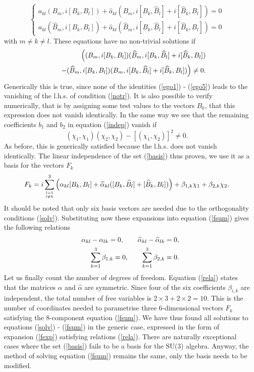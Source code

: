 \documentclass[a4paper,12pt]{article}
\begin{document}
$$ \left\{ \begin{array}{l} 
 \! a_{kl} (B_m,i[B_k,B_l]) + \widehat{a}_{kl} (B_m,i[B_k,\widehat{B}_l] + i[\widehat{B}_k,B_l]) = 0 \\
 \! a_{kl} (\widehat{B}_m,i[B_k,B_l]) + \widehat{a}_{kl} (\widehat{B}_m,i[B_k,\widehat{B}_l] + i[\widehat{B}_k,B_l]) = 0
 \end{array} \right. $$
with $m \neq k \neq l.$ These equations have no non-trivial solutions if
\begin{eqnarray} \label{notr}
&& \Bigl( (B_m,i[B_k,B_l]) (\widehat{B}_m,i[B_k,\widehat{B}_l] + i[\widehat{B}_k,B_l]) \\*
&&\hspace{1em} - (\widehat{B}_m,i[B_k,B_l]) (B_m,i[B_k,\widehat{B}_l] + i[\widehat{B}_k,B_l])  \Bigr) \neq 0. 
\nonumber 
\end{eqnarray}
Generically this is true, since none of the identities (\ref{ego1}) - (\ref{ego5}) leads to the vanishing of the l.h.s. of condition (\ref{notr}). It is also possible to verify numerically, that is by assigning some test values to the vectors $B_k$, that this expression does not vanish identically.
In the same way we see that the remaining coefficients $b_1$ and $b_2$ in equation (\ref{indep}) vanish if
$$ (\chi_1,\chi_1) (\chi_2,\chi_2) - \left[ (\chi_1,\chi_2) \right]^2 \neq 0. $$
As before, this is generically satisfied because the l.h.s. does not vanish identically. The linear independence of the set (\ref{basis}) thus proven, we use it as a basis for the vectors 
$F_k$  
\begin{equation} \label{fexp}
F_k = i\sum_{l=1 \atop l \neq k}^3 \left( \alpha_{kl} [B_k,B_l] + \widehat{\alpha}_{kl} ([B_k,\widehat{B}_l] + [\widehat{B}_k,B_l]) \right) + \beta_{1,k} \chi_1 + \beta_{2,k} \chi_2.
\end{equation}
It should be noted that only six basis vectors are needed due to the orthogonality conditions (\ref{solv}). Substituting now these expansions into equation (\ref{fsum}) gives the following relations
\begin{eqnarray} \label{rela}
&&\alpha_{kl} - \alpha_{lk} = 0, \qquad \widehat{\alpha}_{kl} - \widehat{\alpha}_{lk} = 0, \nonumber \\*
&&\hspace{0.9em} \sum_{k=1}^3 \beta_{1,k} = 0, \qquad \sum_{k=1}^3 \beta_{2,k} = 0.
\end{eqnarray}
Let us finally count the number of degrees of freedom. Equation (\ref{rela}) states that the matrices $\alpha$ and $\widehat{\alpha}$ are symmetric. Since four of the six coefficients $\beta_{i,k}$ are independent, the total number of free variables is $2 \times 3 + 2 \times 2 = 10$. This is the number of coordinates needed to parametrise three 6-dimensional vectors $F_k$ satisfying the 8-component equation (\ref{fsum}). We have thus found all solutions to equations (\ref{solv}) - (\ref{fsum}) in the generic case, expressed in the form of expansion (\ref{fexp}) satisfying relations (\ref{rela}). There are naturally exceptional cases where the set (\ref{basis}) fails to be a basis for the SU(3) algebra. Anyway, the method of solving equation (\ref{fsum}) remains the same, only the basis needs to be modified.
\end{document}
